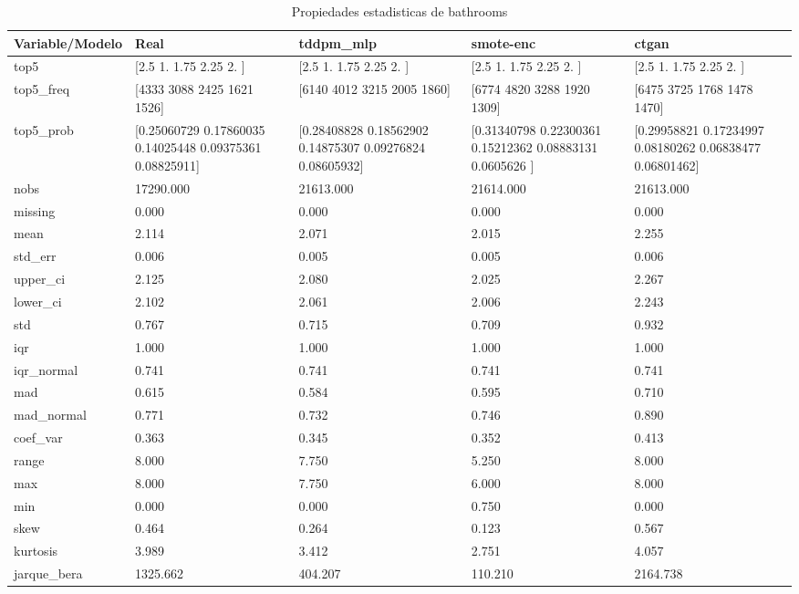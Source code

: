 \begin{table}[H]
\centering
\caption{Propiedades  estadisticas de bathrooms}
\label{table-stats-bathrooms}
\begin{tabular}{|l|m{10em}|m{10em}|m{10em}|m{10em}|}
\hline
 \rowcolor[gray]{0.8}
Variable/Modelo & Real & tddpm\_mlp & smote-enc & ctgan \\
\hline top5 & [2.5  1.   1.75 2.25 2.  ] & [2.5  1.   1.75 2.25 2.  ] & [2.5  1.   1.75 2.25 2.  ] & [2.5  1.   1.75 2.25 2.  ] \\
\hline top5\_freq & [4333 3088 2425 1621 1526] & [6140 4012 3215 2005 1860] & [6774 4820 3288 1920 1309] & [6475 3725 1768 1478 1470] \\
\hline top5\_prob & [0.25060729 0.17860035 0.14025448 0.09375361 0.08825911] & [0.28408828 0.18562902 0.14875307 0.09276824 0.08605932] & [0.31340798 0.22300361 0.15212362 0.08883131 0.0605626 ] & [0.29958821 0.17234997 0.08180262 0.06838477 0.06801462] \\
\hline nobs & 17290.000 & 21613.000 & 21614.000 & 21613.000 \\
\hline missing & 0.000 & 0.000 & 0.000 & 0.000 \\
\hline mean & 2.114 & 2.071 & 2.015 & 2.255 \\
\hline std\_err & 0.006 & 0.005 & 0.005 & 0.006 \\
\hline upper\_ci & 2.125 & 2.080 & 2.025 & 2.267 \\
\hline lower\_ci & 2.102 & 2.061 & 2.006 & 2.243 \\
\hline std & 0.767 & 0.715 & 0.709 & 0.932 \\
\hline iqr & 1.000 & 1.000 & 1.000 & 1.000 \\
\hline iqr\_normal & 0.741 & 0.741 & 0.741 & 0.741 \\
\hline mad & 0.615 & 0.584 & 0.595 & 0.710 \\
\hline mad\_normal & 0.771 & 0.732 & 0.746 & 0.890 \\
\hline coef\_var & 0.363 & 0.345 & 0.352 & 0.413 \\
\hline range & 8.000 & 7.750 & 5.250 & 8.000 \\
\hline max & 8.000 & 7.750 & 6.000 & 8.000 \\
\hline min & 0.000 & 0.000 & 0.750 & 0.000 \\
\hline skew & 0.464 & 0.264 & 0.123 & 0.567 \\
\hline kurtosis & 3.989 & 3.412 & 2.751 & 4.057 \\
\hline jarque\_bera & 1325.662 & 404.207 & 110.210 & 2164.738 \\

\end{tabular}
\end{table}
